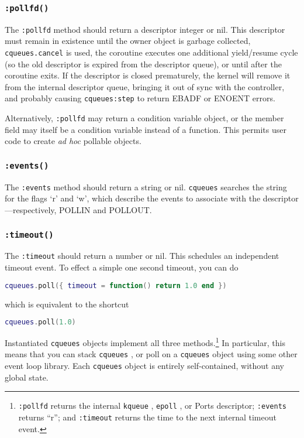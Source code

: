 \documentclass[11pt, oneside]{memoir}
\newcommand{\cqueues}[0]{\texttt{cqueues} }
\newcommand{\syscall}[1]{\texttt{#1} }
\newcommand{\routine}[1]{\texttt{#1} }
\newcommand{\method}[1]{\texttt{#1} }
\begin{document}
\subsubsection[\method{object:pollfd}]{\method{:pollfd()}} The \method{:pollfd} method should return a descriptor integer or nil. This descriptor must remain in existence until the owner object is garbage collected, \routine{cqueues.cancel} is used, the coroutine executes one additional yield/resume cycle (so the old descriptor is expired from the descriptor queue), or until after the coroutine exits. If the descriptor is closed prematurely, the kernel will remove it from the internal descriptor queue, bringing it out of sync with the controller, and probably causing \method{cqueues:step} to return EBADF or ENOENT errors.

Alternatively, \method{:pollfd} may return a condition variable object, or the member field may itself
be a condition variable instead of a function. This permits user code to create \textit{ad hoc} pollable objects.

\subsubsection[\method{object:events}]{\method{:events()}} The \method{:events} method should return a string or nil. \cqueues searches the string for the flags `r' and `w', which describe the events to associate with the descriptor---respectively, POLLIN and POLLOUT.

\subsubsection[\method{object:timeout}]{\method{:timeout()}} The \method{:timeout} should return a number or nil. This schedules an independent timeout event. To effect a simple one second timeout, you can do

\begin{lstlisting}[language=lua]
cqueues.poll({ timeout = function() return 1.0 end })
\end{lstlisting}

which is equivalent to the shortcut

\begin{lstlisting}[language=lua]
cqueues.poll(1.0)
\end{lstlisting}

Instantiated \cqueues objects implement all three methods.\footnote{\method{:pollfd} returns the internal \syscall{kqueue}, \syscall{epoll}, or Ports descriptor; \method{:events} returns ``r''; and \method{:timeout} returns the time to the next internal timeout event.} In particular, this means that you can stack \cqueues, or poll on a \cqueues object using some other event loop library. Each \cqueues object is entirely self-contained, without any global state.
\end{document}
